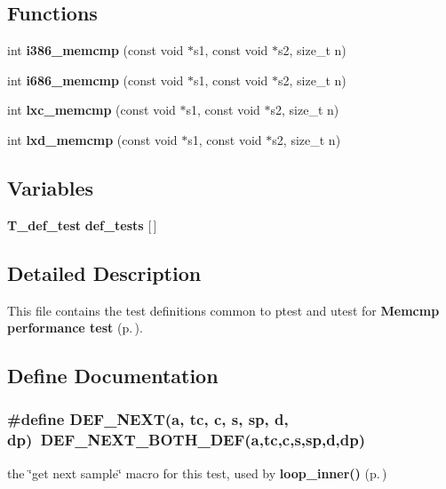 \subsection*{Functions}
\begin{CompactItemize}
\item 
int {\bf i386\_\-memcmp} (const void $\ast$s1, const void $\ast$s2, size\_\-t n)
\item 
int {\bf i686\_\-memcmp} (const void $\ast$s1, const void $\ast$s2, size\_\-t n)
\item 
int {\bf lxc\_\-memcmp} (const void $\ast$s1, const void $\ast$s2, size\_\-t n)
\item 
int {\bf lxd\_\-memcmp} (const void $\ast$s1, const void $\ast$s2, size\_\-t n)
\end{CompactItemize}
\subsection*{Variables}
\begin{CompactItemize}
\item 
{\bf T\_\-def\_\-test} {\bf def\_\-tests} [$\,$]
\end{CompactItemize}


\subsection{Detailed Description}
This file contains the test definitions common to ptest and utest for {\bf Memcmp performance test} {\rm (p.\,\pageref{group__memcmp__test})}.





\subsection{Define Documentation}
\subsubsection{\setlength{\rightskip}{0pt plus 5cm}\#define DEF\_\-NEXT(a, tc, c, s, sp, d, dp)\ DEF\_\-NEXT\_\-BOTH\_\-DEF(a,tc,c,s,sp,d,dp)}\label{memcmp_2def__test_8h_a1}


the \char`\"{}get next sample\char`\"{} macro for this test, used by {\bf loop\_\-inner()} {\rm (p.\,\pageref{group__loop__test_a6})} 
